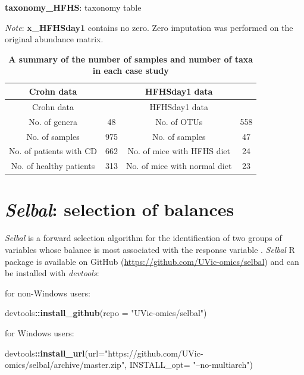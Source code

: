 \documentclass[openany]{book}
\newenvironment{Shaded}{\begin{snugshade}}{\end{snugshade}}
\newcommand{\KeywordTok}[1]{\textcolor[rgb]{0.13,0.29,0.53}{\textbf{#1}}}
\newcommand{\DataTypeTok}[1]{\textcolor[rgb]{0.13,0.29,0.53}{#1}}
\newcommand{\StringTok}[1]{\textcolor[rgb]{0.31,0.60,0.02}{#1}}
\newcommand{\OperatorTok}[1]{\textcolor[rgb]{0.81,0.36,0.00}{\textbf{#1}}}
\newcommand{\NormalTok}[1]{#1}
\begin{document}
\textbf{taxonomy\_HFHS}: taxonomy table

\emph{Note}: \textbf{x\_HFHSday1} contains no zero. Zero imputation was
performed on the original abundance matrix.

\begin{longtable}[]{@{}cccc@{}}
\caption{\label{tab:summary} \textbf{A summary of the number of samples and
number of taxa in each case study}}\tabularnewline
\toprule
Crohn data & & HFHSday1 data &\tabularnewline
\midrule
\endfirsthead
\toprule
Crohn data & & HFHSday1 data &\tabularnewline
\midrule
\endhead
No. of genera & 48 & No. of OTUs & 558\tabularnewline
No. of samples & 975 & No. of samples & 47\tabularnewline
No. of patients with CD & 662 & No. of mice with HFHS diet &
24\tabularnewline
No. of healthy patients & 313 & No. of mice with normal diet &
23\tabularnewline
\bottomrule
\end{longtable}

\chapter{\texorpdfstring{\emph{Selbal}: selection of
balances}{Selbal: selection of balances}}\label{selbal}

\emph{Selbal} is a forward selection algorithm for the identification of
two groups of variables whose balance is most associated with the
response variable \citep{rivera2018balances}. \emph{Selbal} R package is
available on GitHub (\url{https://github.com/UVic-omics/selbal}) and can
be installed with \emph{devtools}:

for non-Windows users:

\begin{Shaded}
\begin{Highlighting}[]
\NormalTok{devtools}\OperatorTok{::}\KeywordTok{install_github}\NormalTok{(}\DataTypeTok{repo =} \StringTok{"UVic-omics/selbal"}\NormalTok{)}
\end{Highlighting}
\end{Shaded}

for Windows users:

\begin{Shaded}
\begin{Highlighting}[]
\NormalTok{devtools}\OperatorTok{::}\KeywordTok{install_url}\NormalTok{(}\DataTypeTok{url=}\StringTok{"https://github.com/UVic-omics/selbal/archive/master.zip"}\NormalTok{, }
                      \DataTypeTok{INSTALL_opt=} \StringTok{"--no-multiarch"}\NormalTok{)}
\end{Highlighting}
\end{Shaded}
\end{document}
